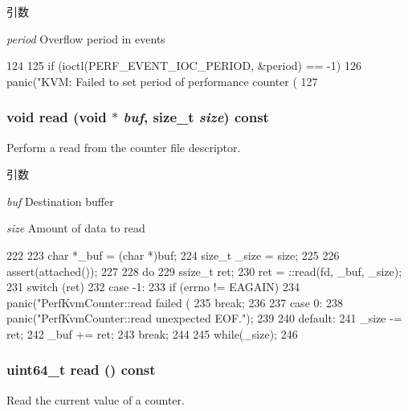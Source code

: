 \begin{DoxyParams}{引数}
\item[{\em period}]Overflow period in events \end{DoxyParams}



\begin{DoxyCode}
124 {
125     if (ioctl(PERF_EVENT_IOC_PERIOD, &period) == -1)
126         panic("KVM: Failed to set period of performance counter (%
127 }
\end{DoxyCode}
\hypertarget{classPerfKvmCounter_a382308644478e0220390350cc53c1a4a}{
\subsubsection[{read}]{\setlength{\rightskip}{0pt plus 5cm}void read (void $\ast$ {\em buf}, \/  size\_\-t {\em size}) const}}
\label{classPerfKvmCounter_a382308644478e0220390350cc53c1a4a}
Perform a read from the counter file descriptor.


\begin{DoxyParams}{引数}
\item[{\em buf}]Destination buffer \item[{\em size}]Amount of data to read \end{DoxyParams}



\begin{DoxyCode}
222 {
223     char *_buf = (char *)buf;
224     size_t _size = size;
225 
226     assert(attached());
227 
228     do {
229         ssize_t ret;
230         ret = ::read(fd, _buf, _size);
231         switch (ret) {
232           case -1:
233             if (errno != EAGAIN)
234                 panic("PerfKvmCounter::read failed (%
235             break;
236 
237           case 0:
238             panic("PerfKvmCounter::read unexpected EOF.\n");
239 
240           default:
241             _size -= ret;
242             _buf += ret;
243             break;
244         }
245     } while(_size);
246 }
\end{DoxyCode}
\hypertarget{classPerfKvmCounter_af2c9c37fc5a5bcdac6d97825066ce801}{
\subsubsection[{read}]{\setlength{\rightskip}{0pt plus 5cm}uint64\_\-t read () const}}
\label{classPerfKvmCounter_af2c9c37fc5a5bcdac6d97825066ce801}
Read the current value of a counter. 


